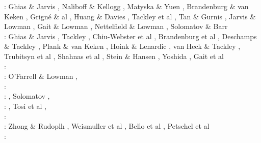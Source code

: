 \begin{scriptsize}
\twothousandseven: Ghias \& Jarvis \cite{ghja07}, Naliboff \& Kellogg \cite{nake07}, 
                   Matyska \& Yuen \cite{mayu07}, Brandenburg \& van Keken \cite{brva07a,brva07b},
                   Grign\'e \& al \cite{grlt07,grlt07b}, Huang \& Davies \cite{huda07},
                   Tackley et al \cite{tanh07}, Tan \& Gurnis \cite{tagu07}, 
                   Jarvis \& Lowman \cite{jalo07}, Gait \& Lowman \cite{galo07,galo07b}, 
                   Nettelfield \& Lowman \cite{nelo07}, Solomatov \& Barr \cite{soba07}\\
\twothousandeight: Ghias \& Jarvis \cite{ghja08}, Tackley \cite{tack08,tack08b},
                   Chiu-Webster et al \cite{chhl08}, Brandenburg et al \cite{brhv08},
                   Deschamps \& Tackley \cite{deta08}, Plank \& van Keken \cite{plva08},
                   Hoink \& Lenardic \cite{hole08}, van Heck \& Tackley \cite{vata08},
                   Trubitsyn et al \cite{trkr08}, Shahnas et al \cite{shlj08},
                   Stein \& Hansen \cite{stha08}, Yoshida \cite{yosh08}, Gait et al \cite{galg08}\\
\twothousandnine: \cite{wodd09}\cite{fobe09}\cite{gows09}\cite{deta09}\cite{onlj09}\cite{wazh09}\cite{vavv09}
      \cite{brha09}\cite{scbs09b}\cite{oebm09}\cite{fuog09}\\
\twothousandten: O'Farrell \& Lowman \cite{oflo10}, \cite{bumb10}\cite{detn10}\cite{yayh10}\cite{nata10}\cite{hole10}\cite{zhzl10}\cite{vayb10}
      \cite{brmw10}\\
\twothousandeleven: \cite{lowm11}\cite{rota11}\cite{woda11}\cite{lemj11}\cite{befa11}\cite{pewb11}\\
\twothousandtwelve: \cite{bisa12}\cite{cort12b}\cite{deyt12}, Solomatov \cite{solo12}, \cite{wele12}\\
\twothousandthirteen: \cite{holj13}\cite{dadb13}, Tosi et al \cite{toyd13}, \cite{bogs13a}\cite{busa13}\cite{mika13}
                      \cite{fabc13}\cite{cosr13}\cite{coml13}\cite{cost13}\cite{stha13}
                      \cite{plth13}\cite{oflb13}\\
\twothousandfourteen: \cite{arfw14}\cite{helo14}\cite{crta14}\cite{flgw14}
                      \cite{roct14}\cite{cort14}\cite{becr14}
                      \cite{nata14}\cite{stha14}\cite{stlh14}\cite{ogaw14}\\
\twothousandfifteen: Zhong \& Rudoplh \cite{zhru15}, Weismuller et al \cite{wegg15},
                     Bello et al \cite{bect15}, Petschel et al \cite{pesw15}\\
\twothousandsixteen: \cite{frbs16}\cite{sisc16}\cite{boba16}\cite{wele16}\cite{welm16}

\end{scriptsize}
